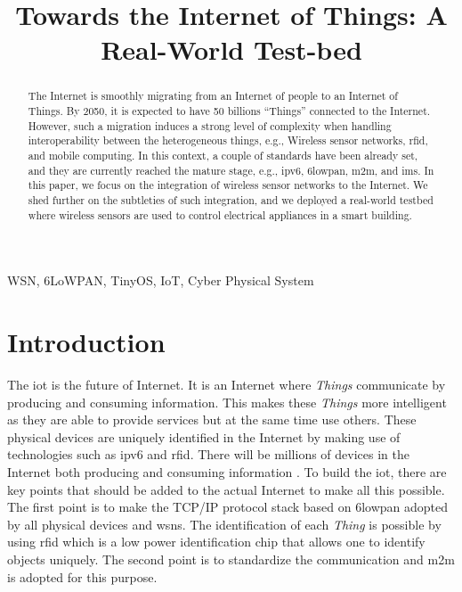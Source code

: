 \documentclass[conference]{IEEEtran}
\begin{document}

\title{Towards the Internet of Things: A Real-World Test-bed}
\author{
\and
{}
\and
{}
}
\maketitle
\begin{abstract}
The Internet is smoothly migrating from an Internet of people to an Internet of Things. By 2050, it is expected to have 50 billions “Things” connected to the Internet. 
However, such a migration induces a strong level of complexity when handling interoperability between the heterogeneous things, e.g., Wireless sensor networks, \gls{rfid}, and mobile computing. In this context, a couple of standards have been already set, and they are currently reached the mature stage, e.g., \gls{ipv6}, \gls{6lowpan}, \gls{m2m}, and \gls{ims}. In this paper, we focus on the integration of wireless sensor networks to the Internet. We shed further on the subtleties of such integration, and we deployed a real-world testbed where wireless sensors are used to control electrical appliances in a smart building. 
\end{abstract}

\begin{IEEEkeywords}
WSN, 6LoWPAN, TinyOS, IoT, Cyber Physical System
\end{IEEEkeywords}

\section{Introduction}
The \gls{iot} is the future of Internet. It is an Internet where \textit{Things} communicate by producing and consuming information. This makes these \textit{Things} more intelligent as they are able to provide services but at the same time use others. These physical devices are uniquely identified in the Internet by making use of technologies such as \gls{ipv6} and \gls{rfid}. There will be millions of devices in the Internet both producing and consuming information \cite{ref8}. To build the \gls{iot}, there are key points that should be added to the actual Internet to make all this possible. The first point is to make the TCP/IP protocol stack based on \gls{6lowpan} adopted by all physical devices and \glspl{wsn}. The identification of each \textit{Thing} is possible by using \gls{rfid} which is a low power identification chip that allows one to identify objects uniquely. The second point is to standardize the communication and \gls{m2m} is adopted for this purpose.
\end{document}
